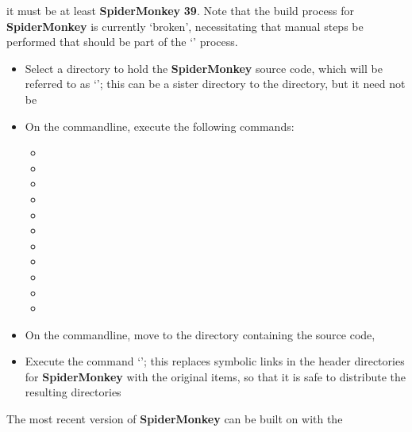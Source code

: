 it must be at least \textbf{SpiderMonkey} \textbf{39}.
Note that the build process for \textbf{SpiderMonkey} is currently `broken', necessitating
that manual steps be performed that should be part of the `' process.
\begin{itemize}
\item Select a directory to hold the \textbf{SpiderMonkey} source code, which will be
referred to as `'; this can be a sister directory to the
 directory, but it need not be
\item\exSp{}On the command\longDash{}line, execute the following commands:
\begin{itemize}
\item {}
\item\exSp{}
\item\exSp{}
\item\exSp{}
\item\exSp{}
\item\exSp{}
\item\exSp{}
\item\exSp{}
\item\exSp{}
\item\exSp{}
\item\exSp{}
\end{itemize}
\item\exSp{}On the command\longDash{}line, move to the directory containing the \mplusm{}
source code, 
\item\exSp{}Execute the command `'; this replaces symbolic links in the
header directories for \textbf{SpiderMonkey} with the original items, so that it is safe
to distribute the resulting directories
\end{itemize}
\tertiaryEnd
{}
The most recent version of \textbf{SpiderMonkey} can be built on \win{} with the

